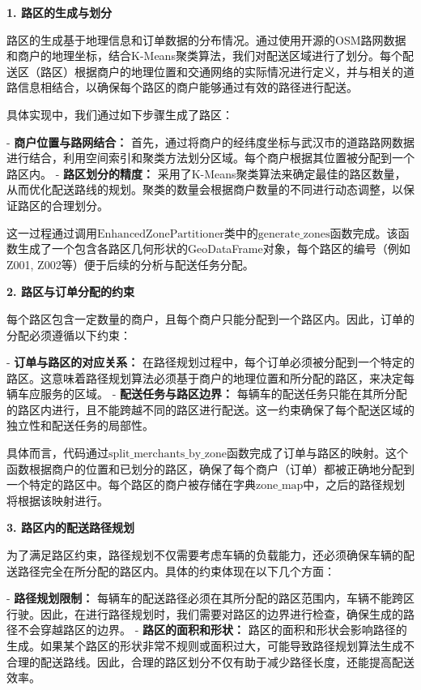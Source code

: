 \documentclass[12pt,a4paper,twoside]{ctexbook}
\begin{document}
\textbf{1. 路区的生成与划分}

路区的生成基于地理信息和订单数据的分布情况。通过使用开源的OSM路网数据和商户的地理坐标，结合K-Means聚类算法，我们对配送区域进行了划分。每个配送区（路区）根据商户的地理位置和交通网络的实际情况进行定义，并与相关的道路信息相结合，以确保每个路区的商户能够通过有效的路径进行配送。

具体实现中，我们通过如下步骤生成了路区：

- \textbf{商户位置与路网结合：} 首先，通过将商户的经纬度坐标与武汉市的道路路网数据进行结合，利用空间索引和聚类方法划分区域。每个商户根据其位置被分配到一个路区内。
- \textbf{路区划分的精度：} 采用了K-Means聚类算法来确定最佳的路区数量，从而优化配送路线的规划。聚类的数量会根据商户数量的不同进行动态调整，以保证路区的合理划分。

这一过程通过调用$ \text{EnhancedZonePartitioner} $类中的$ \text{generate\_zones} $函数完成。该函数生成了一个包含各路区几何形状的GeoDataFrame对象，每个路区的编号（例如Z001, Z002等）便于后续的分析与配送任务分配。

\textbf{2. 路区与订单分配的约束}

每个路区包含一定数量的商户，且每个商户只能分配到一个路区内。因此，订单的分配必须遵循以下约束：

- \textbf{订单与路区的对应关系：} 在路径规划过程中，每个订单必须被分配到一个特定的路区。这意味着路径规划算法必须基于商户的地理位置和所分配的路区，来决定每辆车应服务的区域。
- \textbf{配送任务与路区边界：} 每辆车的配送任务只能在其所分配的路区内进行，且不能跨越不同的路区进行配送。这一约束确保了每个配送区域的独立性和配送任务的局部性。

具体而言，代码通过$ \text{split\_merchants\_by\_zone} $函数完成了订单与路区的映射。这个函数根据商户的位置和已划分的路区，确保了每个商户（订单）都被正确地分配到一个特定的路区中。每个路区的商户被存储在字典$ \text{zone\_map} $中，之后的路径规划将根据该映射进行。

\textbf{3. 路区内的配送路径规划}

为了满足路区约束，路径规划不仅需要考虑车辆的负载能力，还必须确保车辆的配送路径完全在所分配的路区内。具体的约束体现在以下几个方面：

- \textbf{路径规划限制：} 每辆车的配送路径必须在其所分配的路区范围内，车辆不能跨区行驶。因此，在进行路径规划时，我们需要对路区的边界进行检查，确保生成的路径不会穿越路区的边界。
- \textbf{路区的面积和形状：} 路区的面积和形状会影响路径的生成。如果某个路区的形状非常不规则或面积过大，可能导致路径规划算法生成不合理的配送路线。因此，合理的路区划分不仅有助于减少路径长度，还能提高配送效率。
\end{document}
